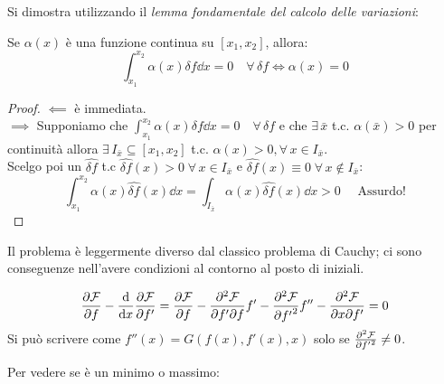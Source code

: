 Si dimostra utilizzando il \textit{lemma fondamentale del calcolo delle variazioni}:
\begin{lemma}
    Se $\alpha(x)$ è una funzione continua su $[x_1,x_2]$, allora:
    \begin{equation}
        \int_{x_1}^{x_2} \alpha(x)\delta f \dd{x}= 0 \quad \forall\,\delta f  \iff \alpha(x)=0
    \end{equation}
\end{lemma}
\begin{proof}
    $\impliedby$ è immediata.\\
    $\implies$ Supponiamo che $\int_{x_1}^{x_2} \alpha(x)\delta f \dd{x}= 0 \quad \forall\,\delta f$ 
    e che $\exists\,\bar{x}$ t.c. $\alpha(\bar{x})>0$ per continuità allora $\exists\,I_{\bar{x}}\subseteq[x_1,x_2]$ t.c. $\alpha(x)>0, \forall\,x\in I_{\bar{x}}$.\\
    Scelgo poi un $\hat{\delta f}$ t.c $\hat{\delta f}(x)>0 \;\forall\,x\in I_{\bar{x}}$ e $\hat{\delta f}(x)\equiv 0 \;\forall\,x \notin I_{\bar{x}} $:
    \begin{equation*}
        \int_{x_1}^{x_2}\alpha(x)\hat{\delta f}(x)\dd{x}= \int_{I_{\bar{x}}} \alpha(x)\hat{\delta f}(x)\dd{x}>0 \quad\text{ Assurdo!}
    \end{equation*}
\end{proof}


\begin{remark}
Il problema è leggermente diverso dal classico problema di Cauchy;
 ci sono conseguenze nell'avere condizioni al contorno al posto di iniziali.
\end{remark}

\begin{remark}
    \begin{equation*}
        \pdv{\mathcal{F}}{f} - \dv{x} \pdv{\mathcal{F}}{f'} 
        = \pdv{\mathcal{F}}{f} - \pdv[2]{\mathcal{F}}{f'}{f} f' 
        - \pdv[2]{\mathcal{F}}{{f'}} f'' 
        - \pdv[2]{\mathcal{F}}{x}{f'} = 0  
    \end{equation*}
    Si può scrivere come \( f''(x) = G(f(x), f'(x), x) \) solo se \( \pdv[2]{\mathcal{F}}{{f'}}\neq 0 \).
\end{remark}

Per vedere se è un minimo o massimo:

